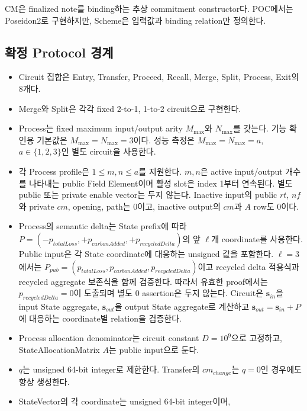 \documentclass[11pt,a4paper]{extarticle}
\newcommand{\CM}{\mathrm{CM}}
\begin{document}
$\CM$은 finalized note를 binding하는 추상 commitment constructor다. POC에서는
Poseidon2로 구현하지만, Scheme은 입력값과 binding relation만 정의한다.

\subsection{확정 Protocol 경계}

\begin{itemize}
  \item Circuit 집합은 Entry, Transfer, Proceed, Recall, Merge, Split,
        Process, Exit의 8개다.
  \item Merge와 Split은 각각 fixed 2-to-1, 1-to-2 circuit으로 구현한다.
  \item Process는 fixed maximum input/output arity $M_{\max}$와 $N_{\max}$를 갖는다.
        기능 확인용 기본값은 $M_{\max}=N_{\max}=3$이다. 성능 측정은
        $M_{\max}=N_{\max}=a$, $a\in\{1,2,3\}$인 별도 circuit을 사용한다.
  \item 각 Process profile은 $1\leq m,n\leq a$를 지원한다. $m,n$은 active input/output
        개수를 나타내는 public Field Element이며 활성 slot은 index 1부터 연속된다.
        별도 public 또는 private enable vector는 두지 않는다. Inactive input의 public
        $rt$, $nf$와 private $cm$, opening, path는 0이고, inactive output의 $cm$과
        $A$ row도 0이다.
  \item Process의 semantic delta는 State prefix에 따라
        $P=(-p_{totalLoss},+p_{carbonAdded},+p_{recycledDelta})$의 앞 $\ell$개
        coordinate를 사용한다.
        Public input은 각 State coordinate에 대응하는 unsigned 값을 포함한다.
        $\ell=3$에서는
        $P_{pub}=(p_{totalLoss},p_{carbonAdded},p_{recycledDelta})$이고
        recycled delta 적용식과 recycled aggregate 보존식을 함께 검증한다. 따라서
        유효한 proof에서는 $p_{recycledDelta}=0$이 도출되며 별도 0 assertion은 두지 않는다.
        Circuit은 $\mathbf{s}_{in}$을 input State aggregate,
        $\mathbf{s}_{out}$을 output State aggregate로 계산하고
        $\mathbf{s}_{out}=\mathbf{s}_{in}+P$에 대응하는 coordinate별 relation을 검증한다.
  \item Process allocation denominator는 circuit constant $D=10^9$으로 고정하고,
        StateAllocationMatrix $A$는 public input으로 둔다.
  \item $q$는 unsigned 64-bit integer로 제한한다. Transfer의
        $cm_{change}$는 $q=0$인 경우에도 항상 생성한다.
  \item StateVector의 각 coordinate는 unsigned 64-bit integer이며,

\end{itemize}
\end{document}

